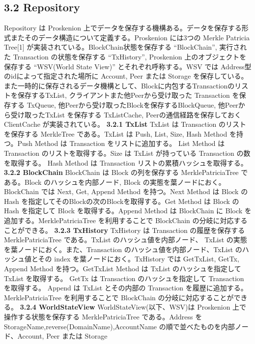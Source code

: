 \hypertarget{repository}{%
\subsection{3.2 Repository}\label{repository}}

Repository は Proskenion
上でデータを保存する機構ある。データを保存する形式またそのデータ構造について定義する。Proskenion
には3つの Merkle Patricia Tree{[}1{]}
が実装されている。BlockChain状態を保存する ``BlockChain'', 実行された
Transaction の状態を保存する ``TxHistory'', Proskenion
上のオブジェクトを保存する ``WSV(World State View)''
とそれぞれ呼称する。WSV では Address型のidによって指定された場所に
Account, Peer または Storage
を保存している。また一時的に保存されるデータ機構として、Blockに内包するTransactionのリストを保存するTxList,
クライアントまた他Peerから受け取った Transaction を保存する TxQueue,
他Peerから受け取ったBlockを保存するBlockQueue,
他Peerから受け取ったTxList を保存する TxListCache,
Peerの通信経路を保存しておくClientCache が実装されている。 \textbf{3.2.1
TxList} TxList は Transaction のリストを保存する MerkleTree
である。TxList は Push, List, Size, Hash Method を持つ。Push Method は
Transaction をリストに追加する。 List Method は Transaction
のリストを取得する。Size は TxList が持っている Transaction
の数を取得する。 Hash Method は Transaction
リストの累積ハッシュを取得する。 \textbf{3.2.2 BlockChain} BlockChain は
Block の列を保存する MerklePatriciaTree である。Block
のハッシュを内部ノード, Block の実態を葉ノードにおく。BlockChain では
Next, Get, Append Method を持つ。Next Method は Block の Hash
を指定してそのBlockの次のBlockを取得する。Get Method は Block の Hash
を指定して Block を取得する。Append Method は BlockChain に Block
を追加する。MerklePatriciaTree を利用することで BlockChain
の分岐に対応することができる。 \textbf{3.2.3 TxHistory} TxHistory は
Transaction の履歴を保存する MerklePatriciaTree である。TxList
のハッシュ値を内部ノード、 TxList
の実態を葉ノードにおく。また、Transaction
のハッシュ値を内部ノード、TxList のハッシュ値とその index
を葉ノードにおく。TxHistory では GetTxList, GetTx, Append Method
を持つ。GetTxList Method は TxList のハッシュを指定して TxList
を取得する。 GetTx は Transaction のハッシュを指定して Transaction
を取得する。 Append は TxList とその内部の Transaction
を履歴に追加する。MerklePatriciaTree を利用することで BlockChain
の分岐に対応することができる。 \textbf{3.2.4 WorldStateView}
WorldStateView(以下、WSV)は Proskenion 上で操作する状態を保存する
MerklePatriciaTree である。Address を
StorageName,reverse(DomainName),AccountName
の順で並べたものを内部ノード、Account, Peer または Storage
